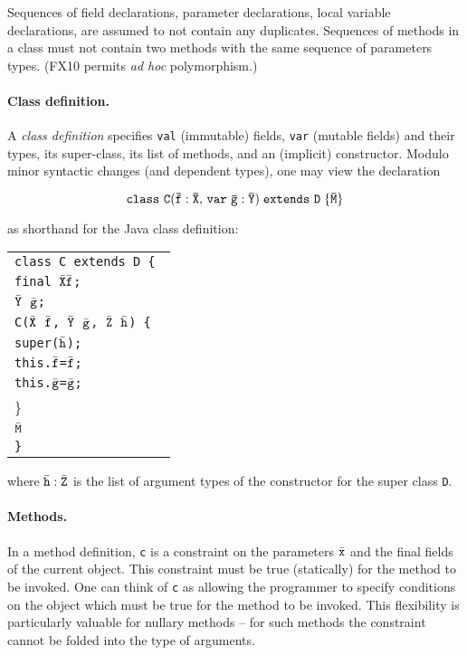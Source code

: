 \documentclass{article}
\def\FXten{{\sf FX10}}
\begin{document}

Sequences of field declarations, parameter declarations, local
variable declarations, are assumed to not contain any duplicates.
Sequences of methods in a class must not contain two methods with the
same sequence of parameters types.  (\FXten{} permits {\em ad hoc}
polymorphism.)

\paragraph{Class definition.}

A {\em class definition} specifies {\tt val} (immutable) fields, {\tt var}
(mutable fields) and their types, its super-class, its list of
methods, and an (implicit) constructor. Modulo minor syntactic changes
(and dependent types), one may view the declaration

$$
{\tt class\ C(\tt \bar{\tt f}:\bar{\tt X},\, var\ \tt\bar{\tt g}:\bar{\tt Y})\;extends\ D\;\{\bar{\tt M}\}}
$$

\noindent as shorthand for the Java class definition:

{\footnotesize
\begin{tabular}[t]{l}
\tt class C extends D \{ \\
\tt  \quad final $\bar{\tt X} \bar{\tt f}$;\\
 \tt \quad $\bar{\tt Y}$\ $\bar{\tt g}$; \\
 \tt \quad C($\bar{\tt X}$\ $\bar{\tt f}$,\,$\bar{\tt Y}$\ $\bar{\tt g}$,\,$\bar{\tt Z}$\ $\bar{\tt h}$) \{\\
  \tt \quad\quad super($\bar{\tt h}$); \\
  \tt \quad\quad this.$\bar{\tt f}$=$\bar{\tt f}$;\\
  \tt \quad\quad this.$\bar{\tt g}$=$\bar{\tt g}$;\\
 \quad \} \\
\tt \quad $\bar{\tt M}$\\
\tt \}
\end{tabular}}

\noindent where $\bar{\tt h}:\bar{\tt Z}$ is the list of argument types of the
constructor for the super class {\tt D}. 

\paragraph{Methods.}
In a method definition, {\tt c} is a constraint on the parameters
$\bar{\tt x}$ and the final fields of the current object.  This
constraint must be true (statically) for the method to be invoked.
One can think of {\tt c} as allowing the programmer to specify
conditions on the object which must be true for the method to be
invoked. This flexibility is particularly valuable for nullary methods
-- for such methods the constraint cannot be folded into the type of
arguments.
\end{document}
